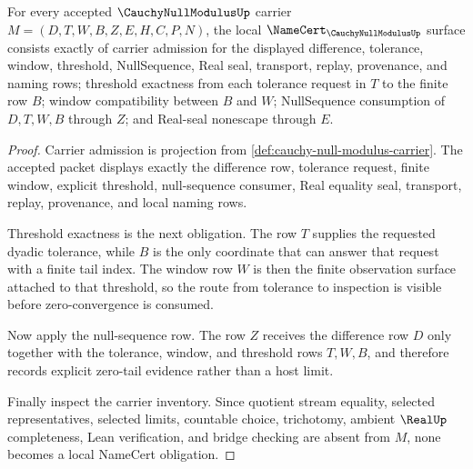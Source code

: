 \begin{theorem}
\label{thm:cauchy-null-modulus-namecert-obligations}
For every accepted $\CauchyNullModulusUp$ carrier $M=(D,T,W,B,Z,E,H,C,P,N)$, the local $\NameCert_{\CauchyNullModulusUp}$ surface consists exactly of carrier admission for the displayed difference, tolerance, window, threshold, NullSequence, Real seal, transport, replay, provenance, and naming rows; threshold exactness from each tolerance request in $T$ to the finite row $B$; window compatibility between $B$ and $W$; NullSequence consumption of $D,T,W,B$ through $Z$; and Real-seal nonescape through $E$.
\end{theorem}
\begin{proof}
Carrier admission is projection from \autoref{def:cauchy-null-modulus-carrier}. The accepted packet displays exactly the difference row, tolerance request, finite window, explicit threshold, null-sequence consumer, Real equality seal, transport, replay, provenance, and local naming rows.

Threshold exactness is the next obligation. The row $T$ supplies the requested dyadic tolerance, while $B$ is the only coordinate that can answer that request with a finite tail index. The window row $W$ is then the finite observation surface attached to that threshold, so the route from tolerance to inspection is visible before zero-convergence is consumed.

Now apply the null-sequence row. The row $Z$ receives the difference row $D$ only together with the tolerance, window, and threshold rows $T,W,B$, and therefore records explicit zero-tail evidence rather than a host limit.

Finally inspect the carrier inventory. Since quotient stream equality, selected representatives, selected limits, countable choice, trichotomy, ambient $\RealUp$ completeness, Lean verification, and bridge checking are absent from $M$, none becomes a local NameCert obligation.
\end{proof}

